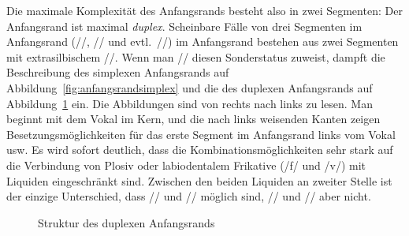 Die maximale Komplexität des Anfangsrands besteht also in zwei Segmenten:
Der Anfangsrand ist maximal \textit{duplex}.
Scheinbare Fälle von drei Segmenten im Anfangsrand (//, // und evtl.\ /\textipa{[Spl}/) im Anfangsrand bestehen aus zwei Segmenten mit extrasilbischem //.
Wenn man // diesen Sonderstatus zuweist, dampft die Beschreibung des simplexen Anfangsrands auf Abbildung~\ref{fig:anfangsrandsimplex} und die des duplexen Anfangsrands auf Abbildung~\ref{fig:anfangsrandduplex} ein.
Die Abbildungen sind von rechts nach links zu lesen.
Man beginnt mit dem Vokal im Kern, und die nach links weisenden Kanten zeigen Besetzungsmöglichkeiten für das erste Segment im Anfangsrand links vom Vokal usw.
Es wird sofort deutlich, dass die Kombinationsmöglichkeiten sehr stark auf die Verbindung von Plosiv oder labiodentalem Frikative (/f/ und /v/) mit Liquiden eingeschränkt sind.
Zwischen den beiden Liquiden an zweiter Stelle ist der einzige Unterschied, dass // und // möglich sind, // und // aber nicht.


\begin{figure}
  \centering
  \caption{Struktur des duplexen Anfangsrands}
  \label{fig:anfangsrandduplex}
\end{figure}

